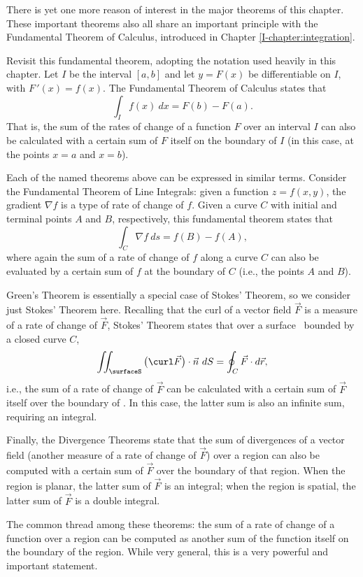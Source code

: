 
There is yet one more reason of interest in the major theorems of this chapter. %
These important theorems also all share an important principle with the Fundamental Theorem of Calculus, introduced in Chapter \ref{I-chapter:integration}. 

Revisit this fundamental theorem, adopting the notation used heavily in this chapter. Let $I$ be the interval $[a,b]$ and let $y=F(x)$ be differentiable on $I$, with $F\,'(x) = f(x)$. The Fundamental Theorem of Calculus states that 
\[
\int_I f(x)\ dx = F(b) - F(a).
\]
That is, the sum of the rates of change of a function $F$ over an interval $I$ can also be calculated with a certain sum of $F$ itself on the boundary of $I$ (in this case, at the points $x=a$ and $x=b$).

Each of the named theorems above can be expressed in similar terms. Consider the Fundamental Theorem of Line Integrals: given a function $z=f(x,y)$, the gradient $\nabla f$ is a type of rate of change of $f$. Given a curve $C$ with initial and terminal points $A$ and $B$, respectively, this fundamental theorem states that 
\[
\int_C \nabla f\ ds = f(B) - f(A),
\]
where again the sum of a rate of change of $f$ along a curve $C$ can also be evaluated by a certain sum of $f$ at the boundary of $C$ (i.e., the points $A$ and $B$).

Green's Theorem is essentially a special case of Stokes' Theorem, so we consider just Stokes' Theorem here. Recalling that the curl of a vector field $\vec F$ is a measure of a rate of change of $\vec F$, Stokes' Theorem states that over a surface \surfaceS\ bounded by a closed curve $C$,
\[
\iint_\surfaceS \big(\curl \vec F\big)\cdot \vec n\ dS = \oint_C \vec F\cdot d\vec r,
\]
i.e., the sum of a rate of change of $\vec F$ can be calculated with a certain sum of $\vec F$ itself over the boundary of \surfaceS. In this case, the latter sum is also an infinite sum, requiring an integral. 

Finally, the Divergence Theorems state that the sum of divergences of a vector field (another measure of a rate of change of $\vec F$) over a region can also be computed with a certain sum of $\vec F$ over the boundary of that region. When the region is planar, the latter sum of $\vec F$ is an integral; when the region is spatial, the latter sum of $\vec F$ is a double integral.

The common thread among these theorems: the sum of a rate of change of a function over a region can be computed as another sum of the function itself on the boundary of the region. While very general, this is a very powerful and important statement.

